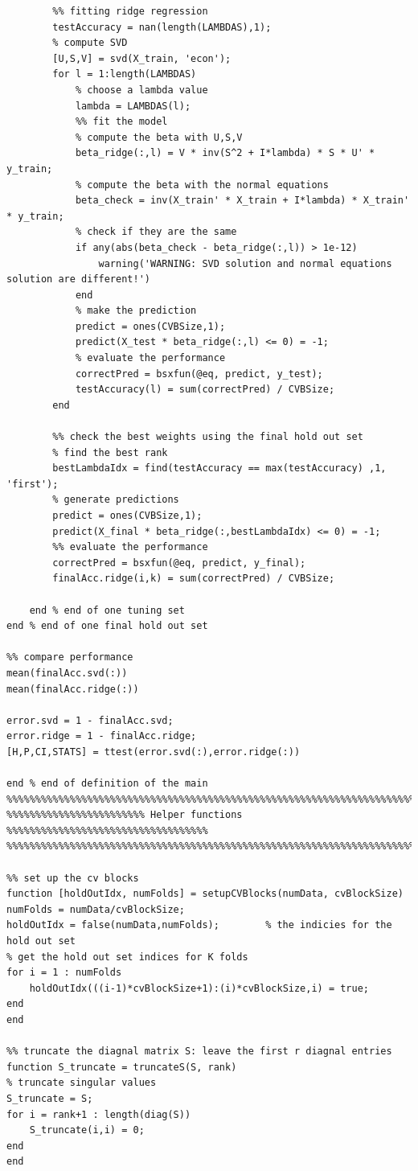 \documentclass[paper=a4, fontsize=11pt]{scrartcl} %
\numberwithin{equation}{section} %
\numberwithin{figure}{section} %
\numberwithin{table}{section} %
\begin{document}
\begin{lstlisting}
        %% fitting ridge regression 
        testAccuracy = nan(length(LAMBDAS),1);
        % compute SVD
        [U,S,V] = svd(X_train, 'econ');
        for l = 1:length(LAMBDAS)
            % choose a lambda value 
            lambda = LAMBDAS(l);
            %% fit the model
            % compute the beta with U,S,V
            beta_ridge(:,l) = V * inv(S^2 + I*lambda) * S * U' * y_train;
            % compute the beta with the normal equations
            beta_check = inv(X_train' * X_train + I*lambda) * X_train' * y_train;
            % check if they are the same
            if any(abs(beta_check - beta_ridge(:,l)) > 1e-12)
                warning('WARNING: SVD solution and normal equations solution are different!')
            end
            % make the prediction
            predict = ones(CVBSize,1);
            predict(X_test * beta_ridge(:,l) <= 0) = -1;
            % evaluate the performance
            correctPred = bsxfun(@eq, predict, y_test);
            testAccuracy(l) = sum(correctPred) / CVBSize;
        end
        
        %% check the best weights using the final hold out set
        % find the best rank
        bestLambdaIdx = find(testAccuracy == max(testAccuracy) ,1, 'first');
        % generate predictions 
        predict = ones(CVBSize,1);
        predict(X_final * beta_ridge(:,bestLambdaIdx) <= 0) = -1;
        %% evaluate the performance
        correctPred = bsxfun(@eq, predict, y_final);
        finalAcc.ridge(i,k) = sum(correctPred) / CVBSize;
        
    end % end of one tuning set 
end % end of one final hold out set

%% compare performance
mean(finalAcc.svd(:))
mean(finalAcc.ridge(:))

error.svd = 1 - finalAcc.svd;
error.ridge = 1 - finalAcc.ridge;
[H,P,CI,STATS] = ttest(error.svd(:),error.ridge(:))

end % end of definition of the main 
%%%%%%%%%%%%%%%%%%%%%%%%%%%%%%%%%%%%%%%%%%%%%%%%%%%%%%%%%%%%%%%%%%%%%%%%%%%%%
%%%%%%%%%%%%%%%%%%%%%%%% Helper functions %%%%%%%%%%%%%%%%%%%%%%%%%%%%%%%%%%%
%%%%%%%%%%%%%%%%%%%%%%%%%%%%%%%%%%%%%%%%%%%%%%%%%%%%%%%%%%%%%%%%%%%%%%%%%%%%%

%% set up the cv blocks
function [holdOutIdx, numFolds] = setupCVBlocks(numData, cvBlockSize)
numFolds = numData/cvBlockSize;
holdOutIdx = false(numData,numFolds);        % the indicies for the hold out set
% get the hold out set indices for K folds
for i = 1 : numFolds
    holdOutIdx(((i-1)*cvBlockSize+1):(i)*cvBlockSize,i) = true;
end
end

%% truncate the diagnal matrix S: leave the first r diagnal entries
function S_truncate = truncateS(S, rank)
% truncate singular values
S_truncate = S;
for i = rank+1 : length(diag(S))
    S_truncate(i,i) = 0;
end
end

\end{lstlisting}
\end{document}
